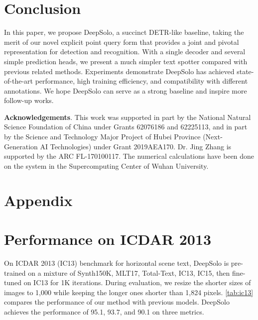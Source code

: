 \documentclass[10pt,twocolumn,letterpaper]{article}
\begin{document}
\begin{table}[!t]
\section{Conclusion}
In this paper, we propose DeepSolo, a succinct DETR-like baseline, taking the merit of our novel explicit point query form that provides a joint and pivotal representation for detection and recognition. With a single decoder and several simple prediction heads, we present a much simpler text spotter compared with previous related methods. Experiments demonstrate DeepSolo has achieved state-of-the-art performance, high training efficiency, and compatibility with different annotations. We hope DeepSolo can serve as a strong baseline and inspire more follow-up works.

\noindent \textbf{Acknowledgements}. This work was supported in part by the National Natural Science Foundation of China under Grants 62076186 and 62225113, and in part by the Science and Technology Major Project of Hubei Province (Next-Generation AI Technologies) under Grant 2019AEA170. Dr. Jing Zhang is supported by the ARC FL-170100117. The numerical calculations have been done on the system in the Supercomputing Center of Wuhan University.


\appendix
{\centering\section*{Appendix}}
\section{Performance on ICDAR 2013}
On ICDAR 2013 (IC13) benchmark for horizontal scene text, DeepSolo is pre-trained on a mixture of Synth150K, MLT17, Total-Text, IC13, IC15, then fine-tuned on IC13 for 1K iterations. During evaluation, we resize the shorter sizes of images to 1,000 while keeping the longer ones shorter than 1,824 pixels. \cref{tab:ic13} compares the performance of our method with previous models. DeepSolo achieves the performance of 95.1, 93.7, and 90.1 on three metrics.


\end{table}
\end{document}
